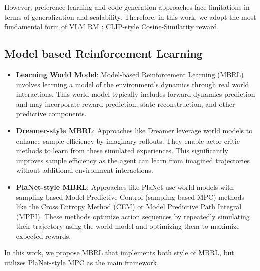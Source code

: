 \documentclass[11pt]{article}
\begin{document}
However, preference learning and code generation approaches face limitations in terms of generalization and scalability. Therefore, in this work, we adopt the most fundamental form of VLM RM : CLIP-style Cosine-Similarity reward.

\subsection{Model based Reinforcement Learning}
\begin{itemize}
    \item \textbf{Learning World Model}: Model-based Reinforcement Learning (MBRL) involves learning a model of the environment's dynamics through real world interactions. This world model typically includes forward dynamics prediction and may incorporate reward prediction, state reconstruction, and other predictive components.
    
    \item \textbf{Dreamer-style MBRL}: Approaches like Dreamer \cite{dreamer} leverage world models to enhance sample efficiency by imaginary rollouts. They enable actor-critic methods to learn from these simulated experiences. This significantly improves sample efficiency as the agent can learn from imagined trajectories without additional environment interactions.
    
    \item \textbf{PlaNet-style MBRL}: Approaches like PlaNet \cite{planet} use world models with sampling-based Model Predictive Control (sampling-based MPC) methods like the Cross Entropy Method (CEM) or Model Predictive Path Integral (MPPI). These methods optimize action sequences by repeatedly simulating their trajectory using the world model and optimizing them to maximize expected rewards.
\end{itemize}

In this work, we propose MBRL that implements both style of MBRL, but utilizes PlaNet-style MPC as the main framework.
\end{document}
